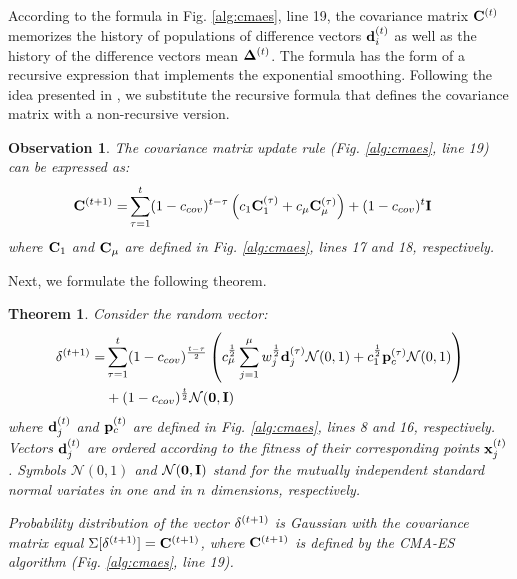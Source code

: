 \documentclass[dvipsnames,format=sigconf,anonymous=false,review=false]{acmart}
\newtheorem{theorem}{Theorem}
\newtheorem{observation}{Observation}
\begin{document}
According to the formula in Fig. \ref{alg:cmaes}, line 19, the covariance matrix ${\bf C}^{(t)}$ memorizes the history of populations of difference vectors ${\bf d}_i^{(t)}$ as well as the history of the difference vectors mean ${\bf \Delta}^{(t)}$. The formula has the form of a recursive expression that implements the exponential smoothing. Following the idea presented in \cite{ArabasJ19}, we substitute  the recursive formula that defines the covariance matrix with a non-recursive version.

\begin{observation}
    
The covariance matrix update rule (Fig. \ref{alg:cmaes}, line 19) can be expressed as:
%
\begin{align}
{\bf C}^{(t+1)}=&\sum_{\tau=1}^{t}(1-c_{cov})^{t-\tau} \left(c_1 {\bf C}_1^{(\tau)} + c_\mu {\bf C}_\mu^{(\tau)}\right)
+(1-c_{cov})^{t} {\bf I}
\label{eq:10}
\end{align}
%
where ${\bf C}_1$ and ${\bf C}_\mu$ are defined in Fig. \ref{alg:cmaes}, lines 17 and 18, respectively.
\end{observation}

Next, we formulate the following theorem.

\begin{theorem}
Consider the random vector:
\begin{align}
{\bf \delta}^{(t+1)}=&\sum_{\tau=1}^{t}(1-c_{cov})^{\frac{t-\tau}{2}} \left(c_\mu^{\frac{1}{2}} \sum_{j=1}^\mu w_j^{\frac{1}{2}} {\bf d}_j^{(\tau)}  {\mathcal N}(0,1) + c_1^{\frac{1}{2}} {\bf p}_c^{(\tau)} {\mathcal N}(0,1)\right) \nonumber \\
&+(1-c_{cov})^{\frac{t}{2}} {\mathcal N}({\bf 0},{\bf I})
\label{eq:th1}
\end{align}
where ${\bf d}_j^{(t)}$ and ${\bf p}_c^{(t)}$ are defined in Fig. \ref{alg:cmaes}, lines 8 and 16, respectively. Vectors ${\bf d}_j^{(t)}$ are ordered according to the fitness of their corresponding points ${\bf x}_j^{(t)}$. Symbols ${\mathcal N}(0,1)$ and ${\mathcal N}({\bf 0},{\bf I})$ stand for the mutually independent standard normal variates in one and in $n$ dimensions, respectively.

Probability distribution of the vector ${\bf \delta}^{(t+1)}$ is Gaussian with the covariance matrix equal $\Sigma[
{\bf \delta}^{(t+1)}]={\bf C}^{(t+1)}$, where ${\bf C}^{(t+1)}$ is defined by the CMA-ES algorithm (Fig. \ref{alg:cmaes}, line 19).

\end{theorem}
\end{document}
